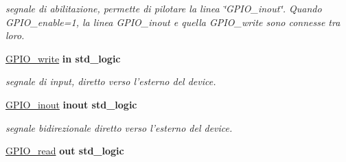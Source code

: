 \begin{DoxyCompactItemize}
\begin{DoxyCompactList}\small\item\em segnale di abilitazione, permette di pilotare la linea \char`\"{}\+G\+P\+I\+O\+\_\+inout\char`\"{}. Quando G\+P\+I\+O\+\_\+enable=1, la linea G\+P\+I\+O\+\_\+inout e quella G\+P\+I\+O\+\_\+write sono connesse tra loro. \end{DoxyCompactList}\item 
\hypertarget{group__my_g_p_i_o_ga20547939f304c722cb29df650d7ca7ef}{\hyperlink{group__my_g_p_i_o_ga20547939f304c722cb29df650d7ca7ef}{G\+P\+I\+O\+\_\+write}  {\bfseries {\bfseries \textcolor{vhdlchar}{in}\textcolor{vhdlchar}{ }}} {\bfseries \textcolor{vhdlchar}{std\+\_\+logic}\textcolor{vhdlchar}{ }} }\label{group__my_g_p_i_o_ga20547939f304c722cb29df650d7ca7ef}

\begin{DoxyCompactList}\small\item\em segnale di input, diretto verso l'esterno del device. \end{DoxyCompactList}\item 
\hypertarget{group__my_g_p_i_o_ga979707b3e6ce3920d653c07c91e80f70}{\hyperlink{group__my_g_p_i_o_ga979707b3e6ce3920d653c07c91e80f70}{G\+P\+I\+O\+\_\+inout}  {\bfseries {\bfseries \textcolor{vhdlchar}{inout}\textcolor{vhdlchar}{ }}} {\bfseries \textcolor{vhdlchar}{std\+\_\+logic}\textcolor{vhdlchar}{ }} }\label{group__my_g_p_i_o_ga979707b3e6ce3920d653c07c91e80f70}

\begin{DoxyCompactList}\small\item\em segnale bidirezionale diretto verso l'esterno del device. \end{DoxyCompactList}\item 
\hypertarget{group__my_g_p_i_o_ga4a6632a5d5cd6c4e6c1b634286795362}{\hyperlink{group__my_g_p_i_o_ga4a6632a5d5cd6c4e6c1b634286795362}{G\+P\+I\+O\+\_\+read}  {\bfseries {\bfseries \textcolor{vhdlchar}{out}\textcolor{vhdlchar}{ }}} {\bfseries \textcolor{vhdlchar}{std\+\_\+logic}\textcolor{vhdlchar}{ }} }\label{group__my_g_p_i_o_ga4a6632a5d5cd6c4e6c1b634286795362}


\end{DoxyCompactItemize}
